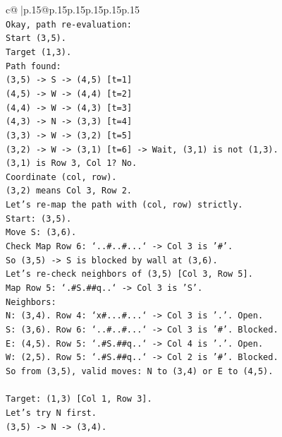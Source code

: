 \documentclass{article}
\begin{document}
{\begin{supertabular}{c@{$\;$}|p{.15\linewidth}@{}p{.15\linewidth}p{.15\linewidth}p{.15\linewidth}p{.15\linewidth}p{.15\linewidth}}
{{{\\ 
\texttt{Okay, path re{-}evaluation:} \\
\texttt{Start (3,5).} \\
\texttt{Target (1,3).} \\
\texttt{Path found:} \\
\texttt{(3,5) {-}> S {-}> (4,5) {[}t=1{]}} \\
\texttt{(4,5) {-}> W {-}> (4,4) {[}t=2{]}} \\
\texttt{(4,4) {-}> W {-}> (4,3) {[}t=3{]}} \\
\texttt{(4,3) {-}> N {-}> (3,3) {[}t=4{]}} \\
\texttt{(3,3) {-}> W {-}> (3,2) {[}t=5{]}} \\
\texttt{(3,2) {-}> W {-}> (3,1) {[}t=6{]} {-}> Wait, (3,1) is not (1,3).} \\
\texttt{(3,1) is Row 3, Col 1? No.} \\
\texttt{Coordinate (col, row).} \\
\texttt{(3,2) means Col 3, Row 2.} \\
\texttt{Let's re{-}map the path with (col, row) strictly.} \\
\texttt{Start: (3,5).} \\
\texttt{Move S: (3,6).} \\
\texttt{Check Map Row 6: `..\#..\#...` {-}> Col 3 is '\#'.} \\
\texttt{So (3,5) {-}> S is blocked by wall at (3,6).} \\
\texttt{Let's re{-}check neighbors of (3,5) {[}Col 3, Row 5{]}.} \\
\texttt{Map Row 5: `.\#S.\#\#q..` {-}> Col 3 is 'S'.} \\
\texttt{Neighbors:} \\
\texttt{N: (3,4). Row 4: `x\#...\#...` {-}> Col 3 is '.'. Open.} \\
\texttt{S: (3,6). Row 6: `..\#..\#...` {-}> Col 3 is '\#'. Blocked.} \\
\texttt{E: (4,5). Row 5: `.\#S.\#\#q..` {-}> Col 4 is '.'. Open.} \\
\texttt{W: (2,5). Row 5: `.\#S.\#\#q..` {-}> Col 2 is '\#'. Blocked.} \\
\texttt{So from (3,5), valid moves: N to (3,4) or E to (4,5).} \\
\\ 
\texttt{Target: (1,3) {[}Col 1, Row 3{]}.} \\
\texttt{Let's try N first.} \\
\texttt{(3,5) {-}> N {-}> (3,4).} \\
}}}
\end{supertabular}}
\end{document}
